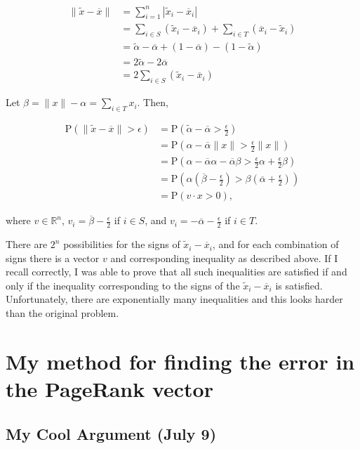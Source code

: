 \documentclass{article}
\newcommand \p[1] {\mathrm P \left(#1\right)}
\begin{document}
\begin{align*}
\|\tilde x-\overline x\| &= \sum_{i=1}^n |\tilde x_i - \overline x_i|  \\
&= \sum_{i\in S} (\tilde x_i - \overline x_i) + \sum_{i\in T} (\overline x_i - \tilde x_i) \\
&= \tilde \alpha - \overline \alpha + (1-\overline \alpha) - (1-\tilde \alpha) \\
&= 2\tilde \alpha - 2\overline \alpha \\
&= 2\sum_{i\in S} (\tilde x_i - \overline x_i)
\end{align*}

Let $\beta=\|x\|-\alpha=\sum_{i\in T} x_i$. Then,

\begin{align*}
\p{\|\tilde x-\overline x\|>\epsilon} &= \p{\tilde\alpha - \overline\alpha > \frac \epsilon 2} \\
&= \p{\alpha - \overline\alpha\|x\| > \frac \epsilon 2 \|x\|} \\
&= \p{\alpha -\overline\alpha \alpha - \overline\alpha \beta > \frac\epsilon 2 \alpha + \frac\epsilon 2 \beta} \\
&= \p{\alpha(\overline\beta - \frac\epsilon 2) > \beta(\overline\alpha + \frac\epsilon 2)} \\
&= \p{v\cdot x> 0},
\end{align*}

where $v \in\mathbb R^n$, $v_i = \overline\beta - \frac\epsilon 2$ if $i\in S$, and $v_i = -\overline\alpha - \frac\epsilon 2$ if $i\in T$.

There are $2^n$ possibilities for the signs of $\tilde x_i - \overline x_i$, and for each combination of signs there is a vector $v$ and corresponding inequality as described above. If I recall correctly, I was able to prove that all such inequalities are satisfied if and only if the inequality corresponding to the signs of the $\tilde x_i - \overline x_i$ is satisfied. Unfortunately, there are exponentially many inequalities and this looks harder than the original problem.

\section{My method for finding the error in the PageRank vector}

\subsection{My Cool Argument (July 9)}
\end{document}
